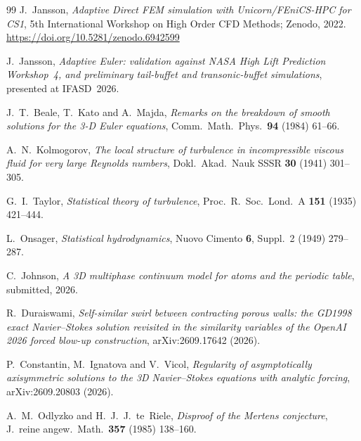 \documentclass[11pt]{article}
\begin{document}
\begin{thebibliography}{99}
 J.~Jansson, \emph{Adaptive Direct FEM simulation with Unicorn/FEniCS-HPC for CS1},
5th International Workshop on High Order CFD Methods; Zenodo, 2022.
\newblock \url{https://doi.org/10.5281/zenodo.6942599}

 J.~Jansson, \emph{Adaptive Euler: validation against NASA High Lift Prediction
Workshop~4, and preliminary tail-buffet and transonic-buffet simulations}, presented at IFASD~2026.

 J.~T.~Beale, T.~Kato and A.~Majda, \emph{Remarks on the breakdown of smooth solutions
for the 3-D Euler equations}, Comm.\ Math.\ Phys.\ \textbf{94} (1984) 61--66.

 A.~N.~Kolmogorov, \emph{The local structure of turbulence in incompressible
viscous fluid for very large Reynolds numbers}, Dokl.\ Akad.\ Nauk SSSR \textbf{30} (1941) 301--305.

 G.~I.~Taylor, \emph{Statistical theory of turbulence}, Proc.\ R.\ Soc.\ Lond.\ A
\textbf{151} (1935) 421--444.

 L.~Onsager, \emph{Statistical hydrodynamics}, Nuovo Cimento \textbf{6},
Suppl.~2 (1949) 279--287.

 C.~Johnson, \emph{A 3D multiphase continuum model for atoms and the periodic
table}, submitted, 2026.

 R.~Duraiswami, \emph{Self-similar swirl between contracting porous walls: the
GD1998 exact Navier--Stokes solution revisited in the similarity variables of the OpenAI 2026 forced
blow-up construction}, arXiv:2609.17642 (2026).

 P.~Constantin, M.~Ignatova and V.~Vicol, \emph{Regularity of asymptotically
axisymmetric solutions to the 3D Navier--Stokes equations with analytic forcing}, arXiv:2609.20803
(2026).

 A.~M.~Odlyzko and H.~J.~J.~te~Riele, \emph{Disproof of the Mertens conjecture},
J.\ reine angew.\ Math.\ \textbf{357} (1985) 138--160.

\end{thebibliography}
\end{document}
